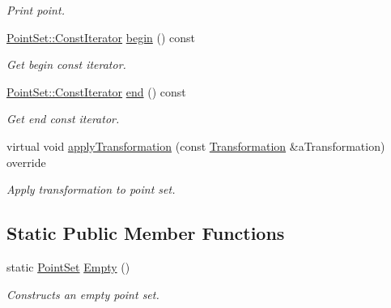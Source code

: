 \begin{DoxyCompactItemize}
\begin{DoxyCompactList}\small\item\em Print point. \end{DoxyCompactList}\item 
\hyperlink{classostk_1_1math_1_1geom_1_1d2_1_1objects_1_1_point_set_a6a0613cc686e9247430658eee91036d0}{Point\+Set\+::\+Const\+Iterator} \hyperlink{classostk_1_1math_1_1geom_1_1d2_1_1objects_1_1_point_set_aaa290d13737a148694f97fc557e2069a}{begin} () const
\begin{DoxyCompactList}\small\item\em Get begin const iterator. \end{DoxyCompactList}\item 
\hyperlink{classostk_1_1math_1_1geom_1_1d2_1_1objects_1_1_point_set_a6a0613cc686e9247430658eee91036d0}{Point\+Set\+::\+Const\+Iterator} \hyperlink{classostk_1_1math_1_1geom_1_1d2_1_1objects_1_1_point_set_a49b262b5d0e453fd1870cce164b7288d}{end} () const
\begin{DoxyCompactList}\small\item\em Get end const iterator. \end{DoxyCompactList}\item 
virtual void \hyperlink{classostk_1_1math_1_1geom_1_1d2_1_1objects_1_1_point_set_a8c4140ca8434580a95df773d3aeed5bb}{apply\+Transformation} (const \hyperlink{classostk_1_1math_1_1geom_1_1d2_1_1_transformation}{Transformation} \&a\+Transformation) override
\begin{DoxyCompactList}\small\item\em Apply transformation to point set. \end{DoxyCompactList}\end{DoxyCompactItemize}
\subsection*{Static Public Member Functions}
\begin{DoxyCompactItemize}
\item 
static \hyperlink{classostk_1_1math_1_1geom_1_1d2_1_1objects_1_1_point_set}{Point\+Set} \hyperlink{classostk_1_1math_1_1geom_1_1d2_1_1objects_1_1_point_set_a09f5e125c7b4545a75e4eea6193bf615}{Empty} ()
\begin{DoxyCompactList}\small\item\em Constructs an empty point set. \end{DoxyCompactList}\end{DoxyCompactItemize}


